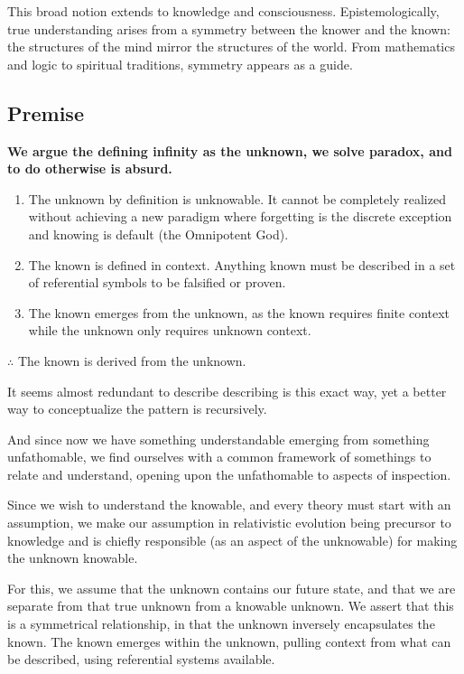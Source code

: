 \documentclass[11pt]{article}
\begin{document}
This broad notion extends to knowledge and consciousness. Epistemologically, true understanding arises from a symmetry between the knower and the known: the structures of the mind mirror the structures of the world. From mathematics and logic to spiritual traditions, symmetry appears as a guide.
\newpage

\subsection*{Premise}
\textbf{We argue the defining infinity as the unknown, we solve paradox, and to do otherwise is absurd.}

\begin{enumerate}
    \item The unknown by definition is unknowable. It cannot be completely realized without achieving a new paradigm where forgetting is the discrete exception and knowing is default (the Omnipotent God).
    \item The known is defined in context. Anything known must be described in a set of referential symbols to be falsified or proven.
    \item The known emerges from the unknown, as the known requires finite context while the unknown only requires unknown context.
\end{enumerate}

\( \therefore \) The known is derived from the unknown.

It seems almost redundant to describe describing is this exact way, yet a better way to conceptualize the pattern is recursively.

And since now we have something understandable emerging from something unfathomable, we find ourselves with a common framework of somethings to relate and understand, opening upon the unfathomable to aspects of inspection.

Since we wish to understand the knowable, and every theory must start with an assumption, we make our assumption in relativistic evolution being precursor to knowledge and is chiefly responsible (as an aspect of the unknowable) for making the unknown knowable.

For this, we assume that the unknown contains our future state, and that we are separate from that true unknown from a knowable unknown. We assert that this is a symmetrical relationship, in that the unknown inversely encapsulates the known. The known emerges within the unknown, pulling context from what can be described, using referential systems available.
\end{document}

